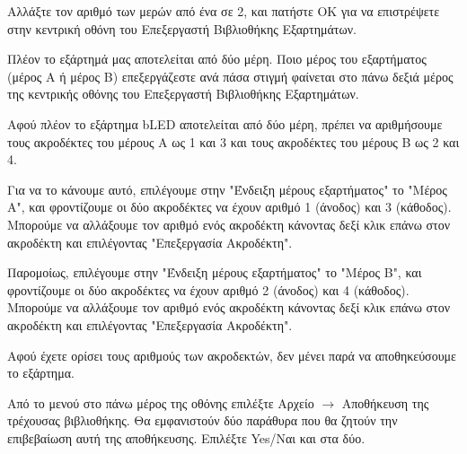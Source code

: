 \documentclass[a4paper]{article}
\begin{document}
Αλλάξτε τον αριθμό των μερών από ένα σε 2, και πατήστε ΟΚ για να επιστρέψετε στην κεντρική οθόνη του Επεξεργαστή Βιβλιοθήκης Εξαρτημάτων.

Πλέον το εξάρτημά μας αποτελείται από δύο μέρη. Ποιο μέρος του εξαρτήματος (μέρος Α ή μέρος Β) επεξεργάζεστε ανά πάσα στιγμή φαίνεται στο πάνω δεξιά μέρος της κεντρικής οθόνης του Επεξεργαστή Βιβλιοθήκης Εξαρτημάτων.

\begin{figure}
  \begin{center}
    \label{fig:kicad-main}
  \end{center}
\end{figure}

Αφού πλέον το εξάρτημα b\textenglish{LED} αποτελείται από δύο μέρη, πρέπει να αριθμήσουμε τους ακροδέκτες του μέρους Α ως 1 και 3 και τους ακροδέκτες του μέρους Β ως 2 και 4.

Για να το κάνουμε αυτό, επιλέγουμε στην "Ένδειξη μέρους εξαρτήματος" το "Μέρος A", και φροντίζουμε οι δύο ακροδέκτες να έχουν αριθμό 1 (άνοδος) και 3 (κάθοδος). Μπορούμε να αλλάξουμε τον αριθμό ενός ακροδέκτη κάνοντας δεξί κλικ επάνω στον ακροδέκτη και επιλέγοντας "Επεξεργασία Ακροδέκτη".

Παρομοίως, επιλέγουμε στην "Ένδειξη μέρους εξαρτήματος" το "Μέρος B", και φροντίζουμε οι δύο ακροδέκτες να έχουν αριθμό 2 (άνοδος) και 4 (κάθοδος). Μπορούμε να αλλάξουμε τον αριθμό ενός ακροδέκτη κάνοντας δεξί κλικ επάνω στον ακροδέκτη και επιλέγοντας "Επεξεργασία Ακροδέκτη".

\begin{figure}
  \begin{center}
    \label{fig:kicad-main}
  \end{center}
\end{figure}

\begin{figure}
  \begin{center}
    \label{fig:kicad-main}
  \end{center}
\end{figure}

Αφού έχετε ορίσει τους αριθμούς των ακροδεκτών, δεν μένει παρά να αποθηκεύσουμε το εξάρτημα.

Από το μενού στο πάνω μέρος της οθόνης επιλέξτε Αρχείο $\rightarrow$ Αποθήκευση της τρέχουσας βιβλιοθήκης. Θα εμφανιστούν δύο παράθυρα που θα ζητούν την επιβεβαίωση αυτή της αποθήκευσης. Επιλέξτε Yes/Ναι και στα δύο.
\end{document}
